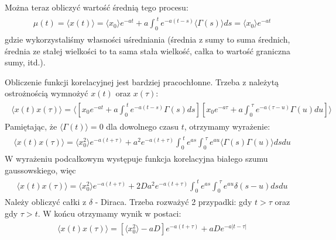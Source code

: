 \documentclass[a4paper,12pt,polish]{sphinxmanual}
\begin{document}
Można teraz obliczyć wartość średnią tego procesu:
\label{ch3/chIII032:equation-eqn5}\begin{gather}
\begin{split}\mu(t) = \langle x(t)\rangle = \langle x_0 \rangle e^{-at} + a \int_0^{\; t} e^{-a(t-s)} \langle \Gamma(s)\rangle ds = \langle x_0 \rangle e^{-at}\end{split}\label{ch3/chIII032-eqn5}
\end{gather}
gdzie wykorzystaliśmy własności uśredniania (średnia z sumy to suma średnich, średnia ze stałej wielkości to ta sama stała wielkość, całka to wartość graniczna sumy, itd.).

Obliczenie funkcji korelacyjnej jest bardziej pracochłonne. Trzeba z należytą ostrożnością wymnożyć $x(t)$ oraz $x(\tau)$:
\label{ch3/chIII032:equation-eqn6}\begin{gather}
\begin{split} \langle x(t) x(\tau) \rangle = \langle \left[ x_0 e^{-at} + a \int_0^{\; t} e^{-a(t-s)} \Gamma(s) ds\right] \left[ x_0 e^{-a\tau} + a \int_0^{\; \tau} e^{-a(\tau -u)} \Gamma(u) du\right] \rangle\end{split}\label{ch3/chIII032-eqn6}
\end{gather}
Pamiętając, że $\langle \Gamma(t)\rangle = 0$ dla dowolnego czasu $t$, otrzymamy wyrażenie:
\label{ch3/chIII032:equation-eqn7}\begin{gather}
\begin{split} \langle x(t) x(\tau) \rangle = \langle x_0^2 \rangle e^{-a(t+\tau)} + a^2 e^{-a(t+\tau)} \int_0^{\; t} e^{as} \int_0^{\; \tau} e^{au} \langle \Gamma(s) \Gamma(u) \rangle ds du\end{split}\label{ch3/chIII032-eqn7}
\end{gather}
W wyrażeniu podcałkowym występuje funkcja korelacyjna białego szumu gaussowskiego, więc
\label{ch3/chIII032:equation-eqn8}\begin{gather}
\begin{split} \langle x(t) x(\tau) \rangle = \langle x_0^2 \rangle e^{-a(t+\tau)} + 2D a^2 e^{-a(t+\tau)} \int_0^{\; t} e^{as} \int_0^{\; \tau} e^{au} \delta(s-u) ds du\end{split}\label{ch3/chIII032-eqn8}
\end{gather}
Należy obliczyć całki z $\delta$ - Diraca. Trzeba rozważyć 2 przypadki: gdy $t>\tau$ oraz gdy $\tau > t$. W końcu otrzymamy wynik w postaci:
\label{ch3/chIII032:equation-eqn9}\begin{gather}
\begin{split} \langle x(t) x(\tau) \rangle = [\langle x_0^2 \rangle -aD] e^{-a(t+\tau)}+ aD e^{-a|t-\tau|}\end{split}\label{ch3/chIII032-eqn9}
\end{gather}
\end{document}
